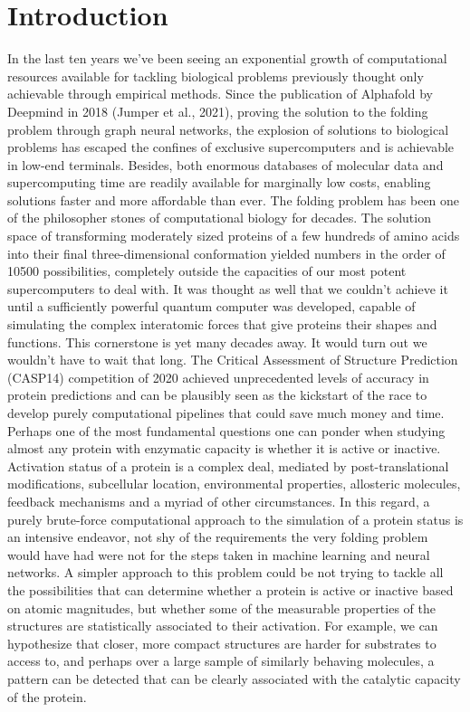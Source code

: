 \documentclass{article}
\begin{document}
\section{Introduction}
In the last ten years we’ve been seeing an exponential growth of computational resources available for tackling biological problems previously thought only achievable through empirical methods. Since the publication of Alphafold by Deepmind in 2018 (Jumper et al., 2021), proving the solution to the folding problem through graph neural networks, the explosion of solutions to biological problems has escaped the confines of exclusive supercomputers and is achievable in low-end terminals. Besides, both enormous databases of molecular data and supercomputing time are readily available for marginally low costs, enabling solutions faster and more affordable than ever.
The folding problem has been one of the philosopher stones of computational biology for decades. The solution space of transforming moderately sized proteins of a few hundreds of amino acids into their final three-dimensional conformation yielded numbers in the order of 10500 possibilities, completely outside the capacities of our most potent supercomputers to deal with. It was thought as well that we couldn’t achieve it until a sufficiently powerful quantum computer was developed, capable of simulating the complex interatomic forces that give proteins their shapes and functions. This cornerstone is yet many decades away.
It would turn out we wouldn’t have to wait that long. The Critical Assessment of Structure Prediction (CASP14) competition of 2020 achieved unprecedented levels of accuracy in protein predictions and can be plausibly seen as the kickstart of the race to develop purely computational pipelines that could save much money and time.
Perhaps one of the most fundamental questions one can ponder when studying almost any protein with enzymatic capacity is whether it is active or inactive. Activation status of a protein is a complex deal, mediated by post-translational modifications, subcellular location, environmental properties, allosteric molecules, feedback mechanisms and a myriad of other circumstances. In this regard, a purely brute-force computational approach to the simulation of a protein status is an intensive endeavor, not shy of the requirements the very folding problem would have had were not for the steps taken in machine learning and neural networks.
A simpler approach to this problem could be not trying to tackle all the possibilities that can determine whether a protein is active or inactive based on atomic magnitudes, but whether some of the measurable properties of the structures are statistically associated to their activation. For example, we can hypothesize that closer, more compact structures are harder for substrates to access to, and perhaps over a large sample of similarly behaving molecules, a pattern can be detected that can be clearly associated with the catalytic capacity of the protein.
\end{document}
